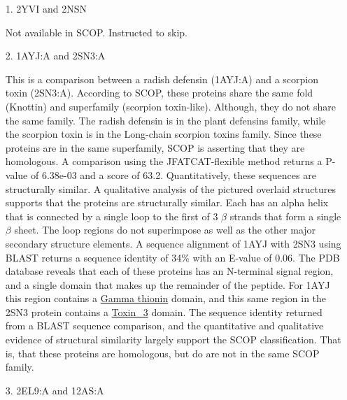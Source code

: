 \documentclass[11pt]{article}
\begin{document}
\begin{itemize}
\item[1.] 2YVI and 2NSN   

Not available in SCOP. Instructed to skip.

\item[2.] 1AYJ:A and 2SN3:A

This is a comparison between a radish defensin (1AYJ:A) and a scorpion toxin (2SN3:A).
According to SCOP, these proteins share the same fold (Knottin) and superfamily (scorpion toxin-like).
Although, they do not share the same family. The radish defensin is in the plant defensins
family, while the scorpion toxin is in the Long-chain scorpion toxins family. Since these proteins
are in the same superfamily, SCOP is asserting that they are homologous. A comparison using the JFATCAT-flexible 
method returns a P-value of 6.38e-03 and a score of 63.2. Quantitatively, these sequences are structurally similar.
A qualitative analysis of the pictured overlaid structures supports that the proteins
are structurally similar. Each has an alpha helix that is connected by a single loop to the
first of 3 $\beta$ strands that form a single $\beta$ sheet. The loop regions do not 
superimpose as well as the other major secondary structure elements. A sequence alignment of
1AYJ with 2SN3 using BLAST returns a sequence identity of 34\% with an E-value of 0.06. The PDB
database reveals that each of these proteins has an N-terminal signal region, and a single domain
that makes up the remainder of the peptide. For 1AYJ this region contains a \href{http://pfam.sanger.ac.uk/family/Gamma-thionin}{Gamma thionin} 
domain, and this same region in the 2SN3 protein contains a 
\href{http://pfam.sanger.ac.uk/family/Toxin_3}{Toxin\_3} domain. The sequence identity returned from a
BLAST sequence comparison, and the quantitative and qualitative evidence of structural similarity largely 
support the SCOP classification. That is, that these proteins are homologous, but do are not in the 
same SCOP family. 

\item[3.] 2EL9:A and 12AS:A


\end{itemize}
\end{document}
